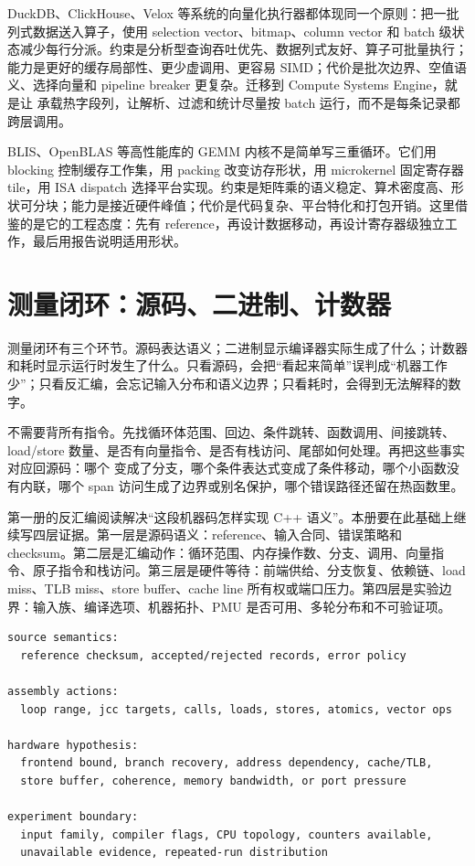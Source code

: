 DuckDB、ClickHouse、Velox 等系统的向量化执行器都体现同一个原则：把一批列式数据送入算子，使用 selection vector、bitmap、column vector 和 batch 级状态减少每行分派。约束是分析型查询吞吐优先、数据列式友好、算子可批量执行；能力是更好的缓存局部性、更少虚调用、更容易 SIMD；代价是批次边界、空值语义、选择向量和 pipeline breaker 更复杂。迁移到 Compute Systems Engine，就是让  承载热字段列，让解析、过滤和统计尽量按 batch 运行，而不是每条记录都跨层调用。

BLIS、OpenBLAS 等高性能库的 GEMM 内核不是简单写三重循环。它们用 blocking 控制缓存工作集，用 packing 改变访存形状，用 microkernel 固定寄存器 tile，用 ISA dispatch 选择平台实现。约束是矩阵乘的语义稳定、算术密度高、形状可分块；能力是接近硬件峰值；代价是代码复杂、平台特化和打包开销。这里借鉴的是它的工程态度：先有 reference，再设计数据移动，再设计寄存器级独立工作，最后用报告说明适用形状。

\section{测量闭环：源码、二进制、计数器}

测量闭环有三个环节。源码表达语义；二进制显示编译器实际生成了什么；计数器和耗时显示运行时发生了什么。只看源码，会把“看起来简单”误判成“机器工作少”；只看反汇编，会忘记输入分布和语义边界；只看耗时，会得到无法解释的数字。

不需要背所有指令。先找循环体范围、回边、条件跳转、函数调用、间接跳转、load/store 数量、是否有向量指令、是否有栈访问、尾部如何处理。再把这些事实对应回源码：哪个  变成了分支，哪个条件表达式变成了条件移动，哪个小函数没有内联，哪个 span 访问生成了边界或别名保护，哪个错误路径还留在热函数里。

第一册的反汇编阅读解决“这段机器码怎样实现 C++ 语义”。本册要在此基础上继续写四层证据。第一层是源码语义：reference、输入合同、错误策略和 checksum。第二层是汇编动作：循环范围、内存操作数、分支、调用、向量指令、原子指令和栈访问。第三层是硬件等待：前端供给、分支恢复、依赖链、load miss、TLB miss、store buffer、cache line 所有权或端口压力。第四层是实验边界：输入族、编译选项、机器拓扑、PMU 是否可用、多轮分布和不可验证项。

\begin{lstlisting}[numbers=none,caption={反汇编审查的四层记录}]
source semantics:
  reference checksum, accepted/rejected records, error policy

assembly actions:
  loop range, jcc targets, calls, loads, stores, atomics, vector ops

hardware hypothesis:
  frontend bound, branch recovery, address dependency, cache/TLB,
  store buffer, coherence, memory bandwidth, or port pressure

experiment boundary:
  input family, compiler flags, CPU topology, counters available,
  unavailable evidence, repeated-run distribution
\end{lstlisting}


